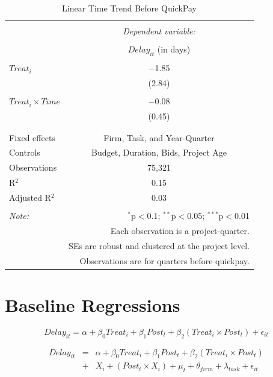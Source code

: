 \documentclass[
]{article}
\begin{document}
\begin{table}[H] \centering 
  \caption{Linear Time Trend Before QuickPay} 
  \label{} 
\small 
\begin{tabular}{@{\extracolsep{5pt}}lc} 
\\[-1.8ex]\hline 
\hline \\[-1.8ex] 
 & \multicolumn{1}{c}{\textit{Dependent variable:}} \\ 
\cline{2-2} 
\\[-1.8ex] & $Delay_{it}$ (in days) \\ 
\hline \\[-1.8ex] 
 $Treat_i$ & $-$1.85 \\ 
  & (2.84) \\ 
  & \\ 
 $Treat_i \times Time$ & $-$0.08 \\ 
  & (0.45) \\ 
  & \\ 
\hline \\[-1.8ex] 
Fixed effects & Firm, Task, and Year-Quarter \\ 
Controls & Budget, Duration, Bids, Project Age \\ 
Observations & 75,321 \\ 
R$^{2}$ & 0.15 \\ 
Adjusted R$^{2}$ & 0.03 \\ 
\hline 
\hline \\[-1.8ex] 
\textit{Note:}  & \multicolumn{1}{r}{$^{*}$p$<$0.1; $^{**}$p$<$0.05; $^{***}$p$<$0.01} \\ 
 & \multicolumn{1}{r}{Each observation is a project-quarter.} \\ 
 & \multicolumn{1}{r}{SEs are robust and clustered at the project level.} \\ 
 & \multicolumn{1}{r}{Observations are for quarters before quickpay.} \\ 
\end{tabular} 
\end{table}

\hypertarget{baseline-regressions}{%
\section{Baseline Regressions}\label{baseline-regressions}}

\[ Delay_{it} = \alpha+\beta_0 Treat_i + \beta_1 Post_t + \beta_2 (Treat_i \times Post_t) + \epsilon_{it}\]

\[ \begin{aligned} Delay_{it} &=& \alpha+\beta_0 Treat_i + \beta_1 Post_t + \beta_2 (Treat_i \times Post_t)\\
&+&  X_i + (Post_t \times X_i) + \mu_t + \theta_{firm} + \lambda_{task}+ \epsilon_{it}
\end{aligned}\]
\end{document}
